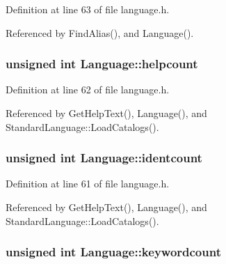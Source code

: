 Definition at line 63 of file language.\+h.



Referenced by Find\+Alias(), and Language().

\subsubsection[{\texorpdfstring{helpcount}{helpcount}}]{\setlength{\rightskip}{0pt plus 5cm}unsigned int Language\+::helpcount\hspace{0.3cm}{\ttfamily [protected]}}\hypertarget{classLanguage_a9eb566a53c9e64a9abd406a77e97d2f0}{}\label{classLanguage_a9eb566a53c9e64a9abd406a77e97d2f0}


Definition at line 62 of file language.\+h.



Referenced by Get\+Help\+Text(), Language(), and Standard\+Language\+::\+Load\+Catalogs().

\subsubsection[{\texorpdfstring{identcount}{identcount}}]{\setlength{\rightskip}{0pt plus 5cm}unsigned int Language\+::identcount\hspace{0.3cm}{\ttfamily [protected]}}\hypertarget{classLanguage_a470e68c0f7517f8f8ffa9ba315b52b0a}{}\label{classLanguage_a470e68c0f7517f8f8ffa9ba315b52b0a}


Definition at line 61 of file language.\+h.



Referenced by Get\+Help\+Text(), Language(), and Standard\+Language\+::\+Load\+Catalogs().

\subsubsection[{\texorpdfstring{keywordcount}{keywordcount}}]{\setlength{\rightskip}{0pt plus 5cm}unsigned int Language\+::keywordcount\hspace{0.3cm}{\ttfamily [protected]}}\hypertarget{classLanguage_ab392fc18ba79a2a47bdde99eec400aa1}{}\label{classLanguage_ab392fc18ba79a2a47bdde99eec400aa1}


